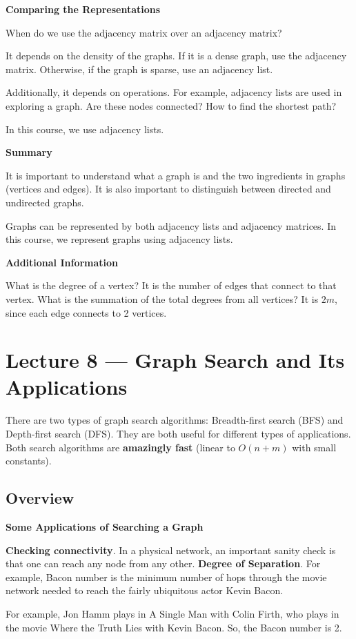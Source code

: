 \documentclass[11pt]{article}
\newcommand{\topsec}[1]{
    \vspace{11pt}
    \section{#1}
    \vspace{11pt}
}
\newcommand{\boldsec}[1]{
    \vspace{11pt}
    \textbf{#1}
    \vspace{11pt}
}
\begin{document}
\boldsec{Comparing the Representations}

When do we use the adjacency matrix over an adjacency matrix? 

It depends on the density of the graphs. If it is a dense graph, use the adjacency matrix. Otherwise, if the graph is sparse, use an adjacency list.

Additionally, it depends on operations. For example, adjacency lists are used in exploring a graph. Are these nodes connected? How to find the shortest path?

In this course, we use adjacency lists.

\boldsec{Summary}

It is important to understand what a graph is and the two ingredients in graphs (vertices and edges). It is also important to distinguish between directed and undirected graphs.

Graphs can be represented by both adjacency lists and adjacency matrices. In this course, we represent graphs using adjacency lists.

\boldsec{Additional Information}

What is the degree of a vertex? It is the number of edges that connect to that vertex. What is the summation of the total degrees from all vertices? It is $2m$, since each edge connects to 2 vertices.

\topsec{Lecture 8 --- Graph Search and Its Applications}

There are two types of graph search algorithms: Breadth-first search (BFS) and Depth-first search (DFS). They are both useful for different types of applications. Both search algorithms are \textbf{amazingly fast} (linear to $O(n+m)$ with small constants).

\vspace{11pt}
\subsection{Overview}
\vspace{11pt}

\boldsec{Some Applications of Searching a Graph}

\textbf{Checking connectivity}. In a physical network, an important sanity check is that one can reach any node from any other. \textbf{Degree of Separation}. For example, Bacon number is the minimum number of hops through the movie network needed to reach the fairly ubiquitous actor Kevin Bacon.

For example, Jon Hamm plays in A Single Man with Colin Firth, who plays in the movie Where the Truth Lies with Kevin Bacon. So, the Bacon number is 2.
\end{document}
